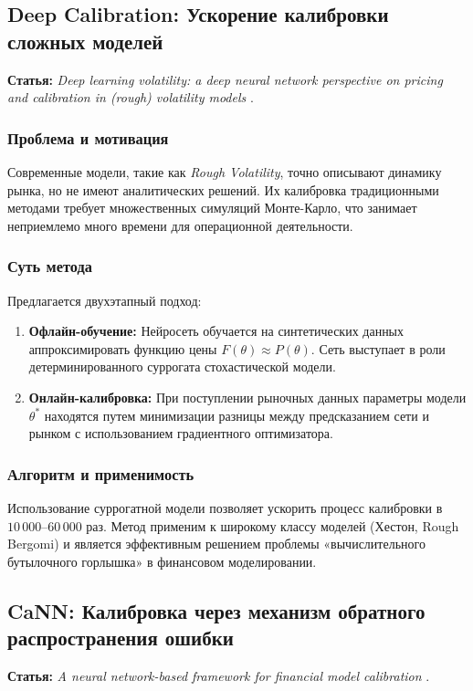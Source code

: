 \documentclass[12pt, a4paper]{article}
\begin{document}
\subsection{Deep Calibration: Ускорение калибровки сложных моделей}
\textbf{Статья:} \textit{Deep learning volatility: a deep neural network perspective on pricing and calibration in (rough) volatility models} \cite{Horvath2019}.

\subsubsection{Проблема и мотивация}
Современные модели, такие как \textit{Rough Volatility}, точно описывают динамику рынка, но не имеют аналитических решений. Их калибровка традиционными методами требует множественных симуляций Монте-Карло, что занимает неприемлемо много времени для операционной деятельности.

\subsubsection{Суть метода}
Предлагается двухэтапный подход:
\begin{enumerate}
    \item \textbf{Офлайн-обучение:} Нейросеть обучается на синтетических данных аппроксимировать функцию цены $F(\theta) \approx P(\theta)$. Сеть выступает в роли детерминированного суррогата стохастической модели.
    \item \textbf{Онлайн-калибровка:} При поступлении рыночных данных параметры модели $\theta^*$ находятся путем минимизации разницы между предсказанием сети и рынком с использованием градиентного оптимизатора.
\end{enumerate}

\subsubsection{Алгоритм и применимость}
Использование суррогатной модели позволяет ускорить процесс калибровки в $10\,000$--$60\,000$ раз. Метод применим к широкому классу моделей (Хестон, Rough Bergomi) и является эффективным решением проблемы «вычислительного бутылочного горлышка» в финансовом моделировании.

\subsection{CaNN: Калибровка через механизм обратного распространения ошибки}
\textbf{Статья:} \textit{A neural network-based framework for financial model calibration} \cite{Liu2019}.
\end{document}
